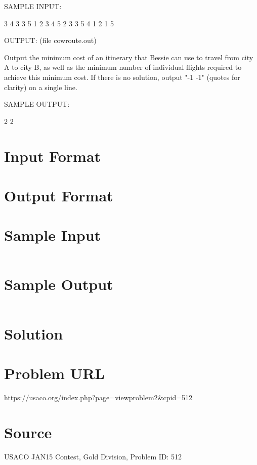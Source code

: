 \documentclass[12pt]{article}
\begin{document}
SAMPLE INPUT:

3 4 3
3 5
1 2 3 4 5
2 3
3 5 4
1 2
1 5

OUTPUT: (file cowroute.out)

Output the minimum cost of an itinerary that Bessie can use to travel
from city A to city B, as well as the minimum number of individual
flights required to achieve this minimum cost.  If there is no
solution, output "-1 -1" (quotes for clarity) on a single line.

SAMPLE OUTPUT:

2 2





\section*{Input Format}


\section*{Output Format}


\section*{Sample Input}
\begin{verbatim}

\end{verbatim}

\section*{Sample Output}
\begin{verbatim}

\end{verbatim}

\section*{Solution}


\section*{Problem URL}
https://usaco.org/index.php?page=viewproblem2&cpid=512

\section*{Source}
USACO JAN15 Contest, Gold Division, Problem ID: 512
\end{document}
